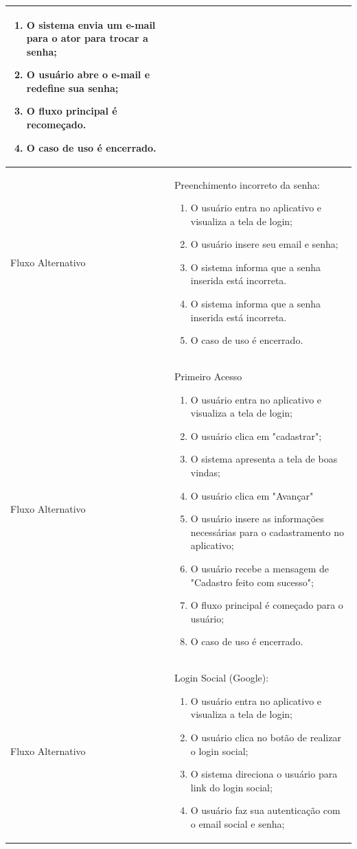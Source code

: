\begin{apendicesenv}
\begin{longtable}{|p{3.3cm}|p{12.3cm}|}
\begin{enumerate}
		\item O sistema envia um e-mail para o ator para trocar a senha;
		\item O usuário abre o e-mail e redefine sua senha;
		\item O fluxo principal é recomeçado.
		\item O caso de uso é encerrado.
	\end{enumerate} \\
	\hline
	Fluxo Alternativo  &  Preenchimento incorreto da senha:
	\begin{enumerate}
		\item O usuário entra no aplicativo e visualiza a tela de login;
		\item O usuário insere seu email e senha;
		\item O sistema informa que a senha inserida está incorreta.
		\item O sistema informa que a senha inserida está incorreta.
		\item O caso de uso é encerrado. 
	\end{enumerate}\\
	\hline
	Fluxo Alternativo & Primeiro Acesso
	\begin{enumerate}
		\item O usuário entra no aplicativo e visualiza a tela de login;
		\item O usuário clica em "cadastrar";
		\item O sistema apresenta a tela de boas vindas;
		\item O usuário clica em "Avançar"
		\item O usuário insere as informações necessárias para o cadastramento no aplicativo;
		\item O usuário recebe a mensagem de "Cadastro feito com sucesso";
		\item O fluxo principal é começado para o usuário;
		\item O caso de uso é encerrado.
	\end{enumerate} \\
	\hline
	Fluxo Alternativo & Login Social (Google):
	\begin{enumerate}
		\item O usuário entra no aplicativo e visualiza a tela de login;
		\item O usuário clica no botão de realizar o login social;
		\item O sistema direciona o usuário para link do login social;
		\item O usuário faz sua autenticação com o email social e senha;

\end{enumerate}
\end{longtable}
\end{apendicesenv}

